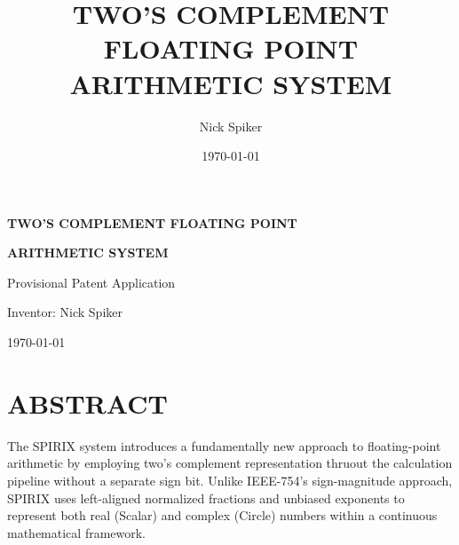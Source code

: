 \documentclass[12pt,letter]{article}
\title{\textbf{TWO'S COMPLEMENT FLOATING POINT ARITHMETIC SYSTEM}}
\author{Nick Spiker}
\date{\today}
\begin{document}
\begin{titlepage}
\begin{center}
\vspace*{1cm}
{\huge \textbf{TWO'S COMPLEMENT FLOATING POINT}\par}
{\huge \textbf{ARITHMETIC SYSTEM}\par}
\vspace{2cm}
{\Large Provisional Patent Application\par}
\vspace{2.5cm}
{\Large Inventor: Nick Spiker\par}
\vspace{1cm}
{\Large \today\par}
\end{center}
\end{titlepage}

\newpage
\renewcommand{\contentsname}{TABLE OF CONTENTS}
\makeatletter
\let\stdl@section\l@section
\renewcommand{\l@section}[2]{%
  \stdl@section{\textbf{#1}}{\textbf{#2}}%
}
\makeatother


\tableofcontents
\newpage
\section*{ABSTRACT}

The SPIRIX system introduces a fundamentally new approach to floating-point arithmetic by employing two's complement representation thruout the calculation pipeline without a separate sign bit. Unlike IEEE-754's sign-magnitude approach, SPIRIX uses left-aligned normalized fractions and unbiased exponents to represent both real (Scalar) and complex (Circle) numbers within a continuous mathematical framework.
\end{document}
